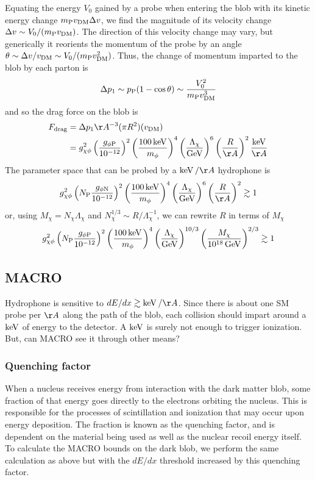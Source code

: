 \documentclass[%
 reprint,
 amsmath,amssymb,
 aps,nofootinbib
]{revtex4-1}
\newcommand{\keV}{\mathinner{\mathrm{keV}}}
\newcommand{\GeV}{\mathinner{\mathrm{GeV}}}
\begin{document}
Equating the energy $V_0$ gained by a probe when entering the blob with its kinetic energy change $m_{\rm P}v_{\rm DM}\Delta v$, we find the magnitude of its velocity change $\Delta v\sim V_0/(m_{\rm P} v_{\rm DM})$. The direction of this velocity change may vary, but generically it reorients the momentum of the probe by an angle $\theta\sim \Delta v/v_{\rm DM}\sim V_0/(m_{\rm P} v_{\rm DM}^2)$. Thus, the change of momentum imparted to the blob by each parton is
\begin{equation}
    \Delta p_1\sim p_{\rm P}(1-\cos \theta)\sim \frac{V_0^2}{m_{\rm P}v_{\rm DM}^3}
\end{equation}
and so the drag force on the blob is
\begin{align}
    F_{\rm drag}&=\Delta p_1\AA^{-3}(\pi R^2)(v_{\rm DM})\\
    &=g_{\chi\phi}^2\left(\frac{g_{\phi \rm P}}{10^{-12}}\right)^2\left(\frac{100\keV}{m_\phi}\right)^4\left(\frac{\Lambda_\chi}{\GeV}\right)^6\left(\frac{R}{\AA}\right)^2 \frac{\keV}{\AA}
\end{align}
The parameter space that can be probed by a $\keV/\AA$ hydrophone is
\begin{equation}
    g_{\chi\phi}^2\left(N_{\rm P}\frac{g_{\phi \rm N}}{10^{-12}}\right)^2\left(\frac{100\keV}{m_\phi}\right)^4\left(\frac{\Lambda_\chi}{\GeV}\right)^6\left(\frac{R}{\AA}\right)^2\gtrsim 1
\end{equation}
or, using $M_\chi=N_\chi \Lambda_\chi$ and $N_\chi^{1/3}\sim R/\Lambda_\chi^{-1}$, we can rewrite $R$ in terms of $M_\chi$
\begin{equation}
    g_{\chi\phi}^2\left(N_{\rm P}\frac{g_{\phi \rm P}}{10^{-12}}\right)^2\left(\frac{100\keV}{m_\phi}\right)^4\left(\frac{\Lambda_\chi}{\GeV}\right)^{10/3}\left(\frac{M_\chi}{10^{18}\GeV}\right)^{2/3}\gtrsim 1
\end{equation}




\subsection{MACRO}
Hydrophone is sensitive to $dE/dx\gtrsim \keV/\AA$. Since there is about one SM probe per $\AA$ along the path of the blob, each collision should impart around a $\keV$ of energy to the detector. A $\keV$ is surely not enough to trigger ionization. But, can MACRO see it through other means?

\subsubsection{Quenching factor}
When a nucleus receives energy from interaction with the dark matter blob, some fraction of that energy goes directly to the electrons orbiting the nucleus. This is responsible for the processes of scintillation and ionization that may occur upon energy deposition. The fraction is known as the quenching factor, and is dependent on the material being used as well as the nuclear recoil energy itself. To calculate the MACRO bounds on the dark blob, we perform the same calculation as above but with the $dE/dx$ threshold increased by this quenching factor. 
\end{document}
